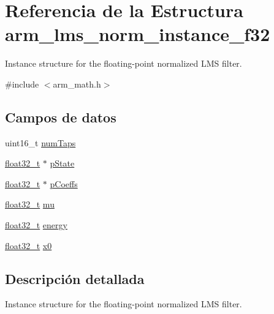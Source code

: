 \hypertarget{structarm__lms__norm__instance__f32}{}\section{Referencia de la Estructura arm\+\_\+lms\+\_\+norm\+\_\+instance\+\_\+f32}
\label{structarm__lms__norm__instance__f32}


Instance structure for the floating-\/point normalized L\+MS filter.  




{\ttfamily \#include $<$arm\+\_\+math.\+h$>$}

\subsection*{Campos de datos}
\begin{DoxyCompactItemize}
\item 
uint16\+\_\+t \hyperlink{structarm__lms__norm__instance__f32_a751941891e47f522a7f5375fe8990aac}{num\+Taps}
\item 
\hyperlink{arm__math_8h_a4611b605e45ab401f02cab15c5e38715}{float32\+\_\+t} $\ast$ \hyperlink{structarm__lms__norm__instance__f32_a335c87e6fdc4b96601d95a5de8b9c463}{p\+State}
\item 
\hyperlink{arm__math_8h_a4611b605e45ab401f02cab15c5e38715}{float32\+\_\+t} $\ast$ \hyperlink{structarm__lms__norm__instance__f32_aacbb8dd8eeba4b21fc2bb40076405ee3}{p\+Coeffs}
\item 
\hyperlink{arm__math_8h_a4611b605e45ab401f02cab15c5e38715}{float32\+\_\+t} \hyperlink{structarm__lms__norm__instance__f32_a11402afa7c9b9dac4cb953fa386e74d2}{mu}
\item 
\hyperlink{arm__math_8h_a4611b605e45ab401f02cab15c5e38715}{float32\+\_\+t} \hyperlink{structarm__lms__norm__instance__f32_ae1ed544b72f1510ed55d144a9424fddd}{energy}
\item 
\hyperlink{arm__math_8h_a4611b605e45ab401f02cab15c5e38715}{float32\+\_\+t} \hyperlink{structarm__lms__norm__instance__f32_ab56b6f83c5b324c3ef620474b6e5a6e1}{x0}
\end{DoxyCompactItemize}


\subsection{Descripción detallada}
Instance structure for the floating-\/point normalized L\+MS filter. 

